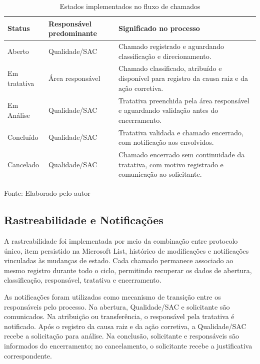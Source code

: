 \begin{table}[H]
\caption{Estados implementados no fluxo de chamados}
\label{tab:estados-chamado}
\centering
\begin{tabular}{p{2.6cm} p{4.2cm} p{5.5cm}}
\hline
\textbf{Status} & \textbf{Responsável predominante} &
\textbf{Significado no processo} \\
\hline
Aberto &
Qualidade/SAC &
Chamado registrado e aguardando classificação e
direcionamento. \\
\hline
Em tratativa &
Área responsável &
Chamado classificado, atribuído e disponível para registro
da causa raiz e da ação corretiva. \\
\hline
Em Análise &
Qualidade/SAC &
Tratativa preenchida pela área responsável e aguardando
validação antes do encerramento. \\
\hline
Concluído &
Qualidade/SAC &
Tratativa validada e chamado encerrado, com notificação aos
envolvidos. \\
\hline
Cancelado &
Qualidade/SAC &
Chamado encerrado sem continuidade da tratativa, com motivo
registrado e comunicação ao solicitante. \\
\hline
\end{tabular}
\raggedright
\par
{\fontsize{10}{12}\selectfont Fonte: Elaborado pelo autor}
\end{table}

\subsection{Rastreabilidade e Notificações}

A rastreabilidade foi implementada por meio da combinação
entre protocolo único, item persistido na Microsoft List,
histórico de modificações e notificações vinculadas às
mudanças de estado. Cada chamado permanece associado ao
mesmo registro durante todo o ciclo, permitindo recuperar
os dados de abertura, classificação, responsável, tratativa
e encerramento.

As notificações foram utilizadas como mecanismo de
transição entre os responsáveis pelo processo. Na abertura,
Qualidade/SAC e solicitante são comunicados. Na atribuição
ou transferência, o responsável pela tratativa é
notificado. Após o registro da causa raiz e da ação
corretiva, a Qualidade/SAC recebe a solicitação para
análise. Na conclusão, solicitante e responsáveis são
informados do encerramento; no cancelamento, o solicitante
recebe a justificativa correspondente.

